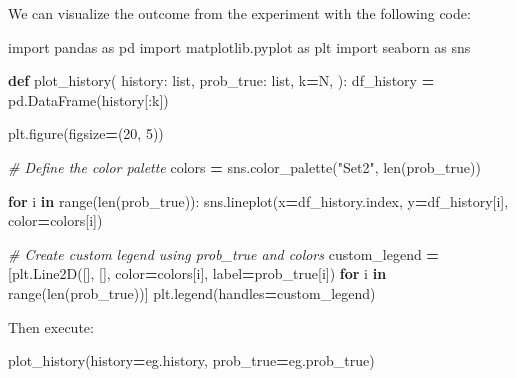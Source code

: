 \documentclass[
]{book}
\newenvironment{Shaded}{\begin{snugshade}}{\end{snugshade}}
\newcommand{\BuiltInTok}[1]{#1}
\newcommand{\CommentTok}[1]{\textcolor[rgb]{0.56,0.35,0.01}{\textit{#1}}}
\newcommand{\ControlFlowTok}[1]{\textcolor[rgb]{0.13,0.29,0.53}{\textbf{#1}}}
\newcommand{\DecValTok}[1]{\textcolor[rgb]{0.00,0.00,0.81}{#1}}
\newcommand{\ImportTok}[1]{#1}
\newcommand{\KeywordTok}[1]{\textcolor[rgb]{0.13,0.29,0.53}{\textbf{#1}}}
\newcommand{\NormalTok}[1]{#1}
\newcommand{\OperatorTok}[1]{\textcolor[rgb]{0.81,0.36,0.00}{\textbf{#1}}}
\newcommand{\StringTok}[1]{\textcolor[rgb]{0.31,0.60,0.02}{#1}}
\theoremstyle{definition}
\theoremstyle{definition}
\theoremstyle{definition}
\theoremstyle{definition}
\theoremstyle{remark}
\begin{document}
We can visualize the outcome from the experiment with the following code:

\begin{Shaded}
\begin{Highlighting}[]
\ImportTok{import}\NormalTok{ pandas }\ImportTok{as}\NormalTok{ pd}
\ImportTok{import}\NormalTok{ matplotlib.pyplot }\ImportTok{as}\NormalTok{ plt}
\ImportTok{import}\NormalTok{ seaborn }\ImportTok{as}\NormalTok{ sns}


\KeywordTok{def}\NormalTok{ plot\_history(}
\NormalTok{        history: }\BuiltInTok{list}\NormalTok{,}
\NormalTok{        prob\_true: }\BuiltInTok{list}\NormalTok{,}
\NormalTok{        k}\OperatorTok{=}\NormalTok{N,}
\NormalTok{):}
\NormalTok{    df\_history }\OperatorTok{=}\NormalTok{ pd.DataFrame(history[:k])}

\NormalTok{    plt.figure(figsize}\OperatorTok{=}\NormalTok{(}\DecValTok{20}\NormalTok{, }\DecValTok{5}\NormalTok{))}

    \CommentTok{\# Define the color palette}
\NormalTok{    colors }\OperatorTok{=}\NormalTok{ sns.color\_palette(}\StringTok{"Set2"}\NormalTok{, }\BuiltInTok{len}\NormalTok{(prob\_true))}

    \ControlFlowTok{for}\NormalTok{ i }\KeywordTok{in} \BuiltInTok{range}\NormalTok{(}\BuiltInTok{len}\NormalTok{(prob\_true)):}
\NormalTok{        sns.lineplot(x}\OperatorTok{=}\NormalTok{df\_history.index, y}\OperatorTok{=}\NormalTok{df\_history[i], color}\OperatorTok{=}\NormalTok{colors[i])}

    \CommentTok{\# Create custom legend using prob\_true and colors}
\NormalTok{    custom\_legend }\OperatorTok{=}\NormalTok{ [plt.Line2D([], [], color}\OperatorTok{=}\NormalTok{colors[i], label}\OperatorTok{=}\NormalTok{prob\_true[i]) }\ControlFlowTok{for}\NormalTok{ i }\KeywordTok{in} \BuiltInTok{range}\NormalTok{(}\BuiltInTok{len}\NormalTok{(prob\_true))]}
\NormalTok{    plt.legend(handles}\OperatorTok{=}\NormalTok{custom\_legend)}
\end{Highlighting}
\end{Shaded}

Then execute:

\begin{Shaded}
\begin{Highlighting}[]
\NormalTok{plot\_history(history}\OperatorTok{=}\NormalTok{eg.history, prob\_true}\OperatorTok{=}\NormalTok{eg.prob\_true)}
\end{Highlighting}
\end{Shaded}
\end{document}
